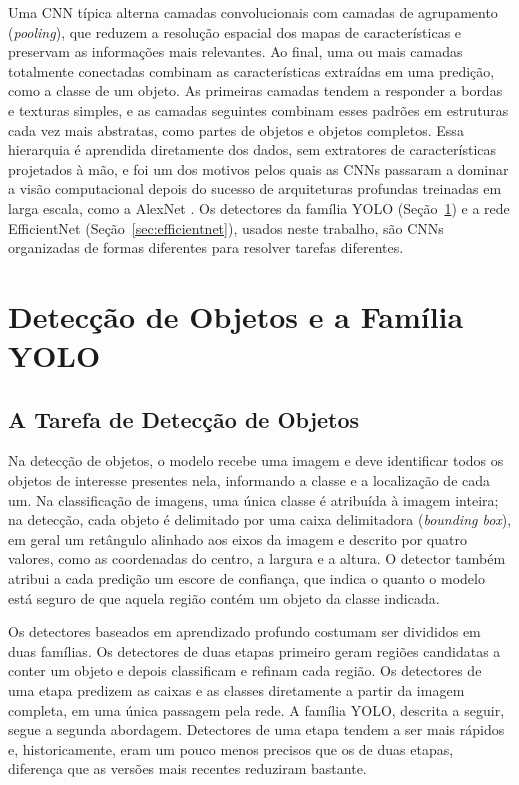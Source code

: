 Uma CNN típica alterna camadas convolucionais com camadas de agrupamento (\textit{pooling}), que reduzem a resolução espacial dos mapas de características e preservam as informações mais relevantes. Ao final, uma ou mais camadas totalmente conectadas combinam as características extraídas em uma predição, como a classe de um objeto. As primeiras camadas tendem a responder a bordas e texturas simples, e as camadas seguintes combinam esses padrões em estruturas cada vez mais abstratas, como partes de objetos e objetos completos. Essa hierarquia é aprendida diretamente dos dados, sem extratores de características projetados à mão, e foi um dos motivos pelos quais as CNNs passaram a dominar a visão computacional depois do sucesso de arquiteturas profundas treinadas em larga escala, como a AlexNet \cite{krizhevsky2012alexnet}. Os detectores da família YOLO (Seção~\ref{sec:deteccao-objetos-yolo}) e a rede EfficientNet (Seção~\ref{sec:efficientnet}), usados neste trabalho, são CNNs organizadas de formas diferentes para resolver tarefas diferentes.

\section{Detecção de Objetos e a Família YOLO}
\label{sec:deteccao-objetos-yolo}

\subsection{A Tarefa de Detecção de Objetos}
\label{subsec:tarefa-deteccao}

Na detecção de objetos, o modelo recebe uma imagem e deve identificar todos os objetos de interesse presentes nela, informando a classe e a localização de cada um. Na classificação de imagens, uma única classe é atribuída à imagem inteira; na detecção, cada objeto é delimitado por uma caixa delimitadora (\textit{bounding box}), em geral um retângulo alinhado aos eixos da imagem e descrito por quatro valores, como as coordenadas do centro, a largura e a altura. O detector também atribui a cada predição um escore de confiança, que indica o quanto o modelo está seguro de que aquela região contém um objeto da classe indicada.

Os detectores baseados em aprendizado profundo costumam ser divididos em duas famílias. Os detectores de duas etapas primeiro geram regiões candidatas a conter um objeto e depois classificam e refinam cada região. Os detectores de uma etapa predizem as caixas e as classes diretamente a partir da imagem completa, em uma única passagem pela rede. A família YOLO, descrita a seguir, segue a segunda abordagem. Detectores de uma etapa tendem a ser mais rápidos e, historicamente, eram um pouco menos precisos que os de duas etapas, diferença que as versões mais recentes reduziram bastante.

